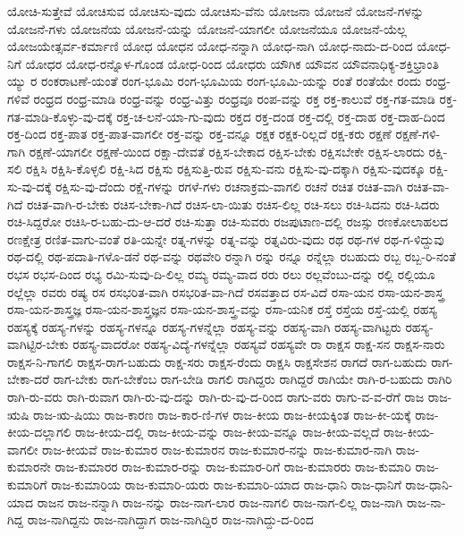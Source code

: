 {ಯೋಚಿ-ಸುತ್ತೇವೆ
ಯೋಚಿಸುವ
ಯೋಚಿಸು-ವುದು
ಯೋಚಿಸು-ವೆನು
ಯೋಜನಾ
ಯೋಜನೆ
ಯೋಜನೆ-ಗಳನ್ನು
ಯೋಜನೆ-ಗಳು
ಯೋಜನೆಯ
ಯೋಜನೆ-ಯನ್ನು
ಯೋಜನೆ-ಯಾಗಲೀ
ಯೋಜನೆಯೂ
ಯೋಜನೆ-ಯೆಲ್ಲ
ಯೋಜಯೇತ್ಸರ್ವ-ಕರ್ಮಾಣಿ
ಯೋಧ
ಯೋಧನ
ಯೋಧ-ನನ್ನಾಗಿ
ಯೋಧ-ನಾಗಿ
ಯೋಧ-ನಾದು-ದ-ರಿಂದ
ಯೋಧ-ನಿಗೆ
ಯೋಧರ
ಯೋಧ-ರನ್ನೊಳ-ಗೊಂಡ
ಯೋಧ-ರಿಂದ
ಯೋಧರು
ಯೌಗಿಕ
ಯೌವನ
ಯೌವನಾಧಿಕ್ಯ-ಶಕ್ತಿಭ್ರಾಂತಿ
ಯ್ಯು
ರ
ರಂಕರಾಟಣೆ-ಯಂತೆ
ರಂಗ-ಭೂಮಿ
ರಂಗ-ಭೂಮಿಯ
ರಂಗ-ಭೂಮಿ-ಯನ್ನು
ರಂತೆ
ರಂತೆಯೇ
ರಂದು
ರಂಧ್ರ-ಗಳಿವೆ
ರಂಧ್ರದ
ರಂಧ್ರ-ಮಾಡಿ
ರಂಧ್ರ-ವನ್ನು
ರಂಧ್ರ-ವಿತ್ತು
ರಂಧ್ರವೂ
ರಂಪ-ವನ್ನು
ರಕ್ತ
ರಕ್ತ-ಕಾಲುವೆ
ರಕ್ತ-ಗತ-ಮಾಡಿ
ರಕ್ತ-ಗತ-ಮಾಡಿ-ಕೊಳ್ಳು-ವು-ದಕ್ಕೆ
ರಕ್ತ-ಚ-ಲನೆ-ಯಾ-ಗು-ವುದು
ರಕ್ತದ
ರಕ್ತ-ದಂಡ
ರಕ್ತ-ದಲ್ಲಿ
ರಕ್ತ-ದಾಹ
ರಕ್ತ-ದಾಹ-ದಿಂದ
ರಕ್ತ-ದಿಂದ
ರಕ್ತ-ಪಾತ
ರಕ್ತ-ಪಾತ-ವಾಗಲೀ
ರಕ್ತ-ವನ್ನು
ರಕ್ತ-ವನ್ನೂ
ರಕ್ಷಕ
ರಕ್ಷಕ-ರಿಲ್ಲದೆ
ರಕ್ಷ-ಕರು
ರಕ್ಷಣೆ
ರಕ್ಷಣೆ-ಗಳಿ-ಗಾಗಿ
ರಕ್ಷಣೆ-ಯಾಗಲೀ
ರಕ್ಷಣೆ-ಯಿಂದ
ರಕ್ಷಾ-ದೇವತೆ
ರಕ್ಷಿಸ-ಬೇಕಾದ
ರಕ್ಷಿಸ-ಬೇಕು
ರಕ್ಷಿಸಬೇಕೇ
ರಕ್ಷಿಸ-ಲಾರದು
ರಕ್ಷಿ-ಸಲಿ
ರಕ್ಷಿಸಿ
ರಕ್ಷಿಸಿ-ಕೊಳ್ಳಲಿ
ರಕ್ಷಿ-ಸಿದ
ರಕ್ಷಿಸು
ರಕ್ಷಿಸುತ್ತಿ-ರುವ
ರಕ್ಷಿಸು-ವನು
ರಕ್ಷಿಸು-ವು-ದಕ್ಕಾಗಿ
ರಕ್ಷಿಸು-ವುದಕ್ಕೂ
ರಕ್ಷಿ-ಸು-ವು-ದಕ್ಕೆ
ರಕ್ಷಿಸು-ವು-ದೆಂದು
ರಕ್ಷೆ-ಗಳನ್ನು
ರಗಳೆ-ಗಳು
ರಚನಾಕ್ರಮ-ವಾಗಲಿ
ರಚನೆ
ರಚಿತ
ರಚಿತ-ವಾಗಿ
ರಚಿತ-ವಾ-ಗಿದೆ
ರಚಿತ-ವಾಗಿ-ರ-ಬೇಕು
ರಚಿಸ-ಬೇಕಾ-ಗಿದೆ
ರಚಿಸ-ಲಾ-ಯಿತು
ರಚಿಸ-ಲಿಲ್ಲ
ರಚಿ-ಸಲು
ರಚಿ-ಸಿದನು
ರಚಿ-ಸಿದರು
ರಚಿ-ಸಿದ್ದರೋ
ರಚಿಸಿ-ರ-ಬಹು-ದು-ಆ-ದರೆ
ರಚಿ-ಸುತ್ತಾ
ರಚಿ-ಸುವರು
ರಜಪುಟಾಣ-ದಲ್ಲಿ
ರಜಸ್ಸು
ರಣಕೋಲಾಹಲದ
ರಣಕ್ಷೇತ್ರ
ರಣಿತ-ವಾಗು-ವಂತೆ
ರತಿ-ಯನ್ನೇ
ರತ್ನ-ಗಳನ್ನು
ರತ್ನ-ವನ್ನು
ರತ್ನವಿರು-ವುದು
ರಥ
ರಥ-ಗಳ
ರಥ-ಗ-ಳಿದ್ದುವು
ರಥ-ದಲ್ಲಿ
ರಥ-ಪದಾತಿ-ಗಳೊ-ಡನೆ
ರಥ-ವನ್ನು
ರಥವೇರಿ
ರನ್ನಾಗಿ
ರನ್ನು
ರನ್ನೂ
ರನ್ನೆಲ್ಲಾ
ರಬಹುದು
ರಬ್ಬ
ರಬ್ಬ-ರಿ-ನಂತೆ
ರಭಸ
ರಭಸ-ದಿಂದ
ರಭ್ಯ
ರಮಿ-ಸುವು-ದಿ-ಲಿಲ್ಲ
ರಮ್ಯ
ರಮ್ಯ-ವಾದ
ರರು
ರಲು
ರಲ್ಲವೆಂಬು-ದನ್ನು
ರಲ್ಲಿ
ರಲ್ಲಿಯೂ
ರಲ್ಲೆಲ್ಲಾ
ರವರು
ರಷ್ಯ
ರಸ
ರಸಭರಿತ-ವಾಗಿ
ರಸಭರಿತ-ವಾ-ಗಿದೆ
ರಸವತ್ತಾದ
ರಸ-ವಿದೆ
ರಸಾ-ಯನ
ರಸಾ-ಯನ-ಶಾಸ್ತ್ರ
ರಸಾ-ಯನ-ಶಾಸ್ತ್ರಜ್ಞ
ರಸಾ-ಯನ-ಶಾಸ್ತ್ರಜ್ಞನ
ರಸಾ-ಯನ-ಶಾಸ್ತ್ರ-ವನ್ನು
ರಸಾ-ಯನಿಕ
ರಸ್ತೆ
ರಸ್ತೆಯ
ರಸ್ತೆ-ಯಲ್ಲಿ
ರಹಸ್ಯ
ರಹಸ್ಯಕ್ಕೆ
ರಹಸ್ಯ-ಗಳನ್ನು
ರಹಸ್ಯ-ಗಳನ್ನೂ
ರಹಸ್ಯ-ಗಳನ್ನೆಲ್ಲಾ
ರಹಸ್ಯ-ವನ್ನು
ರಹಸ್ಯ-ವಾಗಿ
ರಹಸ್ಯ-ವಾಗಿಟ್ಟರು
ರಹಸ್ಯ-ವಾಗಿಟ್ಟಿರ-ಬೇಕು
ರಹಸ್ಯ-ವಾದರೋ
ರಹಸ್ಯ-ವಿದ್ಯೆ-ಗಳನ್ನೆಲ್ಲಾ
ರಹಸ್ಯವೆ
ರಹಸ್ಯವೇ
ರಾ
ರಾಕ್ಷಸ
ರಾಕ್ಷ-ಸನ
ರಾಕ್ಷಸ-ನಾರು
ರಾಕ್ಷಸ-ನಿ-ಗಾಗಲಿ
ರಾಕ್ಷಸ-ರಾಗ-ಬಹುದು
ರಾಕ್ಷ-ಸರು
ರಾಕ್ಷಸ-ರೆಂದು
ರಾಕ್ಷಸಿ
ರಾಕ್ಷಸೇಶನ
ರಾಗದೆ
ರಾಗ-ಬಹುದು
ರಾಗ-ಬೇಕಾ-ದರೆ
ರಾಗ-ಬೇಕು
ರಾಗ-ಬೇಕೆಂಬ
ರಾಗ-ಬೇಡಿ
ರಾಗಲಿ
ರಾಗಿದ್ದರು
ರಾಗಿದ್ದರೆ
ರಾಗಿಯೇ
ರಾಗಿ-ರ-ಬಹುದು
ರಾಗಿರಿ
ರಾಗಿ-ರು-ವರು
ರಾಗಿ-ರುವಾಗ
ರಾಗಿ-ರು-ವು-ದನ್ನು
ರಾಗಿ-ರು-ವು-ದ-ರಿಂದ
ರಾಗು-ವರು
ರಾಗು-ವ-ವ-ರೆಗೆ
ರಾಜ
ರಾಜ-ಋಷಿ
ರಾಜ-ಋ-ಷಿಯು
ರಾಜ-ಕಾರಣ
ರಾಜ-ಕಾರ-ಣಿ-ಗಳ
ರಾಜ-ಕೀಯ
ರಾಜ-ಕೀಯಕ್ಕಿಂತ
ರಾಜ-ಕೀ-ಯಕ್ಕೆ
ರಾಜ-ಕೀಯ-ದಲ್ಲಾಗಲಿ
ರಾಜ-ಕೀಯ-ದಲ್ಲಿ
ರಾಜ-ಕೀಯ-ವನ್ನು
ರಾಜ-ಕೀಯ-ವನ್ನೂ
ರಾಜ-ಕೀಯ-ವಲ್ಲದೆ
ರಾಜ-ಕೀಯ-ವಾಗಲೀ
ರಾಜ-ಕೀಯವೆ
ರಾಜ-ಕುಮಾರ
ರಾಜ-ಕುಮಾರನ
ರಾಜ-ಕುಮಾರ-ನನ್ನು
ರಾಜ-ಕುಮಾರ-ನಾಗಿ
ರಾಜ-ಕುಮಾರನೇ
ರಾಜ-ಕುಮಾರರ
ರಾಜ-ಕುಮಾರ-ರನ್ನು
ರಾಜ-ಕುಮಾರ-ರಿಗೆ
ರಾಜ-ಕುಮಾರರು
ರಾಜ-ಕುಮಾರಿ
ರಾಜ-ಕುಮಾರಿಗೆ
ರಾಜ-ಕುಮಾರಿಯ
ರಾಜ-ಕುಮಾರಿ-ಯರು
ರಾಜ-ಕುಮಾರಿ-ಯಾದ
ರಾಜ-ಧಾನಿ
ರಾಜ-ಧಾನಿಗೆ
ರಾಜ-ಧಾನಿ-ಯಾದ
ರಾಜನ
ರಾಜ-ನನ್ನಾಗಿ
ರಾಜ-ನನ್ನು
ರಾಜ-ನಾಗ-ಲಾರ
ರಾಜ-ನಾಗಲಿ
ರಾಜ-ನಾಗ-ಲಿಲ್ಲ
ರಾಜ-ನಾಗಿ
ರಾಜ-ನಾ-ಗಿದ್ದ
ರಾಜ-ನಾಗಿದ್ದನು
ರಾಜ-ನಾಗಿದ್ದಾಗ
ರಾಜ-ನಾಗಿದ್ದಿರ
ರಾಜ-ನಾಗಿದ್ದು-ದ-ರಿಂದ
}
